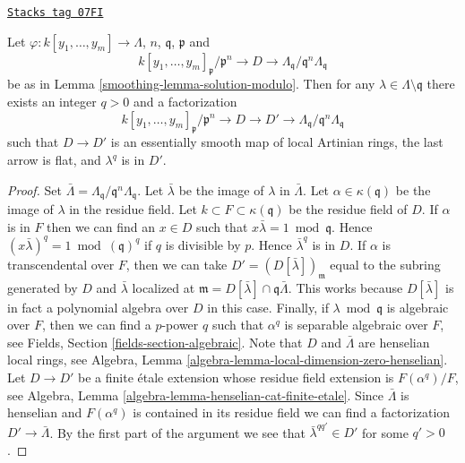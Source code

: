 \begin{lemma}
\label{smoothing-lemma-enlarge-solution-modulo}
\href{https://stacks.math.columbia.edu/tag/07FI}{\texttt{Stacks tag 07FI}}

Let $\varphi : k[y_1, \ldots, y_m] \to \Lambda$, $n$, $\mathfrak q$,
$\mathfrak p$ and
$$
k[y_1, \ldots, y_m]_\mathfrak p/\mathfrak p^n \to
D \to \Lambda_\mathfrak q/\mathfrak q^n \Lambda_\mathfrak q
$$
be as in Lemma \ref{smoothing-lemma-solution-modulo}. Then for any
$\lambda \in \Lambda \setminus \mathfrak q$
there exists an integer $q > 0$ and a factorization
$$
k[y_1, \ldots, y_m]_\mathfrak p/\mathfrak p^n \to
D \to D' \to \Lambda_\mathfrak q/\mathfrak q^n \Lambda_\mathfrak q
$$
such that $D \to D'$ is an essentially smooth map of local Artinian rings,
the last arrow is flat, and $\lambda^q$ is in $D'$.
\end{lemma}

\begin{proof}
Set $\bar \Lambda = \Lambda_\mathfrak q/\mathfrak q^n\Lambda_\mathfrak q$.
Let $\bar \lambda$ be the image of $\lambda$ in $\bar \Lambda$.
Let $\alpha \in \kappa(\mathfrak q)$ be the image of $\lambda$ in the
residue field.
Let $k \subset F \subset \kappa(\mathfrak q)$ be the residue field of $D$.
If $\alpha$ is in $F$ then we can find an
$x \in D$ such that $x \bar\lambda = 1 \bmod \mathfrak q$. Hence
$(x \bar \lambda)^q = 1 \bmod (\mathfrak q)^q$ if $q$ is divisible by $p$.
Hence $\bar\lambda^q$ is in $D$. If $\alpha$ is
transcendental over $F$, then we can take $D' = (D[\bar \lambda])_\mathfrak m$
equal to the subring generated by $D$ and $\bar \lambda$ localized
at $\mathfrak m = D[\bar \lambda] \cap \mathfrak q \bar \Lambda$.
This works because $D[\bar \lambda]$ is in fact a polynomial algebra
over $D$ in this case. Finally, if $\lambda \bmod \mathfrak q$ is
algebraic over $F$, then we can find a $p$-power $q$ such that
$\alpha^q$ is separable algebraic over $F$, see
Fields, Section \ref{fields-section-algebraic}.
Note that $D$ and $\bar\Lambda$ are henselian local rings, see
Algebra, Lemma \ref{algebra-lemma-local-dimension-zero-henselian}.
Let $D \to D'$ be a finite \'etale extension
whose residue field extension is $F(\alpha^q)/F$, see
Algebra, Lemma \ref{algebra-lemma-henselian-cat-finite-etale}.
Since $\bar\Lambda$ is henselian and $F(\alpha^q)$ is contained
in its residue field we can find a factorization
$D' \to \bar \Lambda$. By the first part of the argument
we see that $\bar\lambda^{qq'} \in D'$ for some $q' > 0$.
\end{proof}

